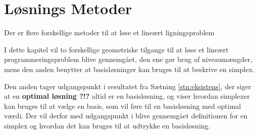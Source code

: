 \chapter{Løsnings Metoder}	
Der er flere forskellige metoder til at løse et lineært ligningsproblem

I dette kapitel vil to forskellige geometriske tilgange til at løse et lineært programmeringsproblem blive gennemgået, den ene gør brug af niveaumængder, mens den anden benytter at basisløsninger kan bruges til at beskrive en simplex.




Den anden tager udgangspunkt i resultatet fra Sætning \ref{stn:eksistens}, der siger at en \textbf{optimal løsning ?!?} altid er en basisløsning, og viser hvordan simplexer kan bruges til at vælge en basis, som vil føre til en basisløsning med optimal værdi.
Der vil derfor med udgangspunkt i %
blive gennemgået definitionen for en simplex og hvordan det kan bruges til at udtrykke en basisløsning.




